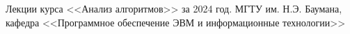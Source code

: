 
\begin{thebibliography}{}
	 Лекции курса <<Анализ алгоритмов>> за 2024 год. МГТУ им. Н.Э. Баумана, кафедра <<Программное обеспечение ЭВМ и информационные технологии>>
\end{thebibliography}
